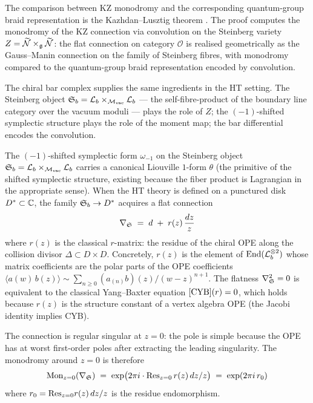 The comparison between KZ monodromy and the corresponding
quantum-group braid representation is the Kazhdan--Lusztig theorem
\cite{kazhdan-lusztig-iv}. The proof computes the monodromy of the KZ
connection via convolution on the Steinberg variety
$Z = \widetilde{\mathcal{N}} \times_{\mathfrak{g}} \widetilde{\mathcal{N}}$: the flat connection on category
$\mathcal{O}$ is realised geometrically as the Gauss--Manin connection
on the family of Steinberg fibres, with monodromy compared to the
quantum-group braid representation encoded by convolution.

The chiral bar complex supplies the same ingredients in the HT
setting. The Steinberg object
$\mathfrak{S}_b = \mathcal{L}_b \times_{\mathcal{M}_{\mathrm{vac}}} \mathcal{L}_b$ — the
self-fibre-product of the boundary line category over the vacuum
moduli — plays the role of $Z$; the $(-1)$-shifted symplectic structure
plays the role of the moment map; the bar differential encodes the
convolution.

\begin{construction}
\label{constr:steinberg-connection}
The $(-1)$-shifted symplectic form $\omega_{-1}$ on the Steinberg object $\mathfrak{S}_b = \mathcal{L}_b \times_{\mathcal{M}_{\mathrm{vac}}} \mathcal{L}_b$ carries a canonical Liouville $1$-form $\theta$ (the primitive of the shifted symplectic structure, existing because the fiber product is Lagrangian in the appropriate sense).
When the HT theory is defined on a punctured disk $D^* \subset \mathbb C$, the family $\mathfrak{S}_b \to D^*$ acquires a flat connection
\[
\nabla_{\mathfrak{S}} \;=\; d \;+\; r(z)\,\frac{dz}{z}
\]
where $r(z)$ is the classical $r$-matrix: the residue of the chiral OPE along the collision divisor $\Delta \subset D \times D$.
Concretely, $r(z)$ is the element of $\mathrm{End}(\mathcal{L}_b^{\otimes 2})$ whose matrix coefficients are the polar parts of the OPE coefficients $\langle a(w)\, b(z) \rangle \sim \sum_{n \geq 0} (a_{(n)} b)(z) / (w-z)^{n+1}$.
The flatness $\nabla_{\mathfrak{S}}^2 = 0$ is equivalent to the classical Yang--Baxter equation $[\mathrm{CYB}](r) = 0$, which holds because $r(z)$ is the structure constant of a vertex algebra OPE (the Jacobi identity implies CYB).

The connection is regular singular at $z = 0$: the pole is simple because the OPE has at worst first-order poles after extracting the leading singularity.
The monodromy around $z = 0$ is therefore
\[
\mathrm{Mon}_{z=0}(\nabla_{\mathfrak{S}}) \;=\; \exp\bigl(2\pi i \cdot \mathrm{Res}_{z=0}\, r(z)\,dz/z\bigr) \;=\; \exp(2\pi i\, r_0)
\]
where $r_0 = \mathrm{Res}_{z=0} r(z)\,dz/z$ is the residue endomorphism.
\end{construction}

